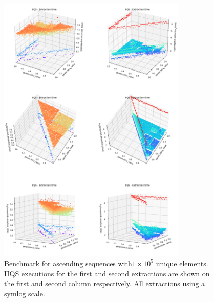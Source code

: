 \begin{figure}[!ht]
    \centering
    \includegraphics[width=0.8\textwidth]{./fragments/04_experimental_execution/images/04_alphabeta_singleclass_asc.png}
    \caption{Benchmark for ascending sequences with$1\times10^5$ unique elements. IIQS executions for the first and second extractions are shown on the first and second column respectively. All extractions using a symlog scale.}
    \label{FIG:05_ALPHABETA_RELATIONSHIP_ASC}
\end{figure}

